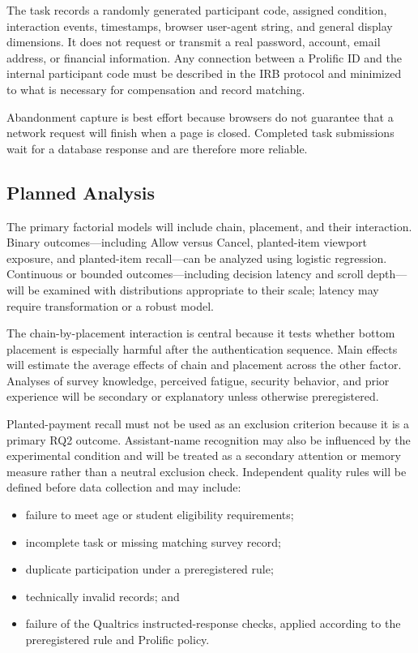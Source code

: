 \documentclass[11pt]{article}
\begin{document}
The task records a randomly generated participant code, assigned condition,
interaction events, timestamps, browser user-agent string, and general display
dimensions. It does not request or transmit a real password, account, email
address, or financial information. Any connection between a Prolific ID and
the internal participant code must be described in the IRB protocol and
minimized to what is necessary for compensation and record matching.

Abandonment capture is best effort because browsers do not guarantee that a
network request will finish when a page is closed. Completed task submissions
wait for a database response and are therefore more reliable.

\subsection{Planned Analysis}

The primary factorial models will include chain, placement, and their
interaction. Binary outcomes---including Allow versus Cancel, planted-item
viewport exposure, and planted-item recall---can be analyzed using logistic
regression. Continuous or bounded outcomes---including decision latency and
scroll depth---will be examined with distributions appropriate to their scale;
latency may require transformation or a robust model.

The chain-by-placement interaction is central because it tests whether bottom
placement is especially harmful after the authentication sequence. Main
effects will estimate the average effects of chain and placement across the
other factor. Analyses of survey knowledge, perceived fatigue, security
behavior, and prior experience will be secondary or explanatory unless
otherwise preregistered.

Planted-payment recall must not be used as an exclusion criterion because it is
a primary RQ2 outcome. Assistant-name recognition may also be influenced by the
experimental condition and will be treated as a secondary attention or memory
measure rather than a neutral exclusion check. Independent quality rules will
be defined before data collection and may include:

\begin{itemize}[leftmargin=1.6em]
  \item failure to meet age or student eligibility requirements;
  \item incomplete task or missing matching survey record;
  \item duplicate participation under a preregistered rule;
  \item technically invalid records; and
  \item failure of the Qualtrics instructed-response checks, applied according
        to the preregistered rule and Prolific policy.
\end{itemize}
\end{document}
